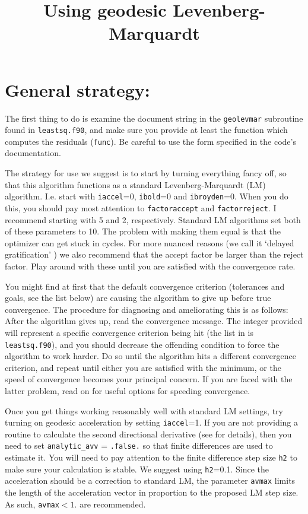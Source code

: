\documentclass[12pt,pdf,singlespace]{article}
\title{Using geodesic Levenberg-Marquardt}
\begin{document}
{
\maketitle
}

\section{General strategy:}

The first thing to do is examine the document string in the \texttt{geolevmar} subroutine found in \texttt{leastsq.f90}, and make sure you provide at least the function which computes the residuals (\texttt{func}). Be careful to use the form specified in the code's documentation.

The strategy for use we suggest is to start by turning everything fancy off, so that this algorithm functions as a standard Levenberg-Marquardt (LM) algorithm. I.e. start with \texttt{iaccel}=0, \texttt{ibold}=0 and \texttt{ibroyden}=0. When you do this, you should pay most attention to \texttt{factoraccept} and \texttt{factorreject}. I recommend starting with 5 and 2, respectively. Standard LM algorithms set both of these parameters to 10. The problem with making them equal is that the optimizer can get stuck in cycles. For more nuanced reasons (we call it `delayed gratification' \cite{transtrum2012improvements}) we also recommend that the accept factor be larger than the reject factor. Play around with these until you are satisfied with the convergence rate.

You might find at first that the default convergence criterion (tolerances and goals, see the list below) are causing the algorithm to give up before true convergence. The procedure for diagnosing and ameliorating this is as follows: After the algorithm gives up, read the convergence message. The integer provided will represent a specific convergence criterion being hit (the list in is \texttt{leastsq.f90}), and you should decrease the offending condition to force the algorithm to work harder. Do so until the algorithm hits a different convergence criterion, and repeat until either you are satisfied with the minimum, or the speed of convergence becomes your principal concern. If you are faced with the latter problem, read on for useful options for speeding convergence.

Once you get things working reasonably well with standard LM settings, try turning on geodesic acceleration by setting \texttt{iaccel}=1. If you are not providing a routine to calculate the second directional derivative (see \cite{transtrum2012improvements, PRE83} for details), then you need to set \texttt{analytic\_avv} = \texttt{.false.} so that finite differences are used to estimate it. You will need to pay attention to the finite difference step size \texttt{h2} to make sure your calculation is stable. We suggest using \texttt{h2}=0.1. Since the acceleration should be a correction to standard LM, the parameter \texttt{avmax} limits the length of the acceleration vector in proportion to the proposed LM step size. As such, \texttt{avmax}$<1.$ are recommended.
\end{document}
